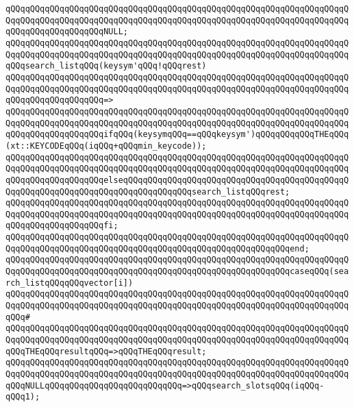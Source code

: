 \verb|qQQqqQQqqQQqqQQqqQQqqQQqqQQqqQQqqQQqqQQqqQQqqQQqqQQqqQQqqQQqqQQqqQQqqQQqqQQqqQQqqQQqqQQqqQQqqQQqqQQqqQQqqQQqqQQqqQQqqQQqqQQqqQQqqQQqqQQqqQQqqQQqqQQqqQQqqQQqqQQqNULL;|\newline
\newline
\verb|qQQqqQQqqQQqqQQqqQQqqQQqqQQqqQQqqQQqqQQqqQQqqQQqqQQqqQQqqQQqqQQqqQQqqQQqqQQqqQQqqQQqqQQqqQQqqQQqqQQqqQQqqQQqqQQqqQQqqQQqqQQqqQQqqQQqqQQqqQQqqQQqsearch_listqQQq(keysym'qQQq!qQQqrest)|\newline
\verb|qQQqqQQqqQQqqQQqqQQqqQQqqQQqqQQqqQQqqQQqqQQqqQQqqQQqqQQqqQQqqQQqqQQqqQQqqQQqqQQqqQQqqQQqqQQqqQQqqQQqqQQqqQQqqQQqqQQqqQQqqQQqqQQqqQQqqQQqqQQqqQQqqQQqqQQqqQQqqQQq=>|\newline
\verb|qQQqqQQqqQQqqQQqqQQqqQQqqQQqqQQqqQQqqQQqqQQqqQQqqQQqqQQqqQQqqQQqqQQqqQQqqQQqqQQqqQQqqQQqqQQqqQQqqQQqqQQqqQQqqQQqqQQqqQQqqQQqqQQqqQQqqQQqqQQqqQQqqQQqqQQqqQQqqQQqifqQQq(keysymqQQq==qQQqkeysym')qQQqqQQqqQQqTHEqQQq(xt::KEYCODEqQQq(iqQQq+qQQqmin_keycode));|\newline
\verb|qQQqqQQqqQQqqQQqqQQqqQQqqQQqqQQqqQQqqQQqqQQqqQQqqQQqqQQqqQQqqQQqqQQqqQQqqQQqqQQqqQQqqQQqqQQqqQQqqQQqqQQqqQQqqQQqqQQqqQQqqQQqqQQqqQQqqQQqqQQqqQQqqQQqqQQqqQQqqQQqelseqQQqqQQqqQQqqQQqqQQqqQQqqQQqqQQqqQQqqQQqqQQqqQQqqQQqqQQqqQQqqQQqqQQqqQQqqQQqqQQqqQQqsearch_listqQQqrest;|\newline
\verb|qQQqqQQqqQQqqQQqqQQqqQQqqQQqqQQqqQQqqQQqqQQqqQQqqQQqqQQqqQQqqQQqqQQqqQQqqQQqqQQqqQQqqQQqqQQqqQQqqQQqqQQqqQQqqQQqqQQqqQQqqQQqqQQqqQQqqQQqqQQqqQQqqQQqqQQqqQQqqQQqfi;|\newline
\verb|qQQqqQQqqQQqqQQqqQQqqQQqqQQqqQQqqQQqqQQqqQQqqQQqqQQqqQQqqQQqqQQqqQQqqQQqqQQqqQQqqQQqqQQqqQQqqQQqqQQqqQQqqQQqqQQqqQQqqQQqqQQqqQQqend;|\newline
\newline
\verb|qQQqqQQqqQQqqQQqqQQqqQQqqQQqqQQqqQQqqQQqqQQqqQQqqQQqqQQqqQQqqQQqqQQqqQQqqQQqqQQqqQQqqQQqqQQqqQQqqQQqqQQqqQQqqQQqqQQqqQQqqQQqqQQqcaseqQQq(search_listqQQqqQQqvector[i])|\newline
\verb|qQQqqQQqqQQqqQQqqQQqqQQqqQQqqQQqqQQqqQQqqQQqqQQqqQQqqQQqqQQqqQQqqQQqqQQqqQQqqQQqqQQqqQQqqQQqqQQqqQQqqQQqqQQqqQQqqQQqqQQqqQQqqQQqqQQqqQQqqQQqqQQq#|\newline
\verb|qQQqqQQqqQQqqQQqqQQqqQQqqQQqqQQqqQQqqQQqqQQqqQQqqQQqqQQqqQQqqQQqqQQqqQQqqQQqqQQqqQQqqQQqqQQqqQQqqQQqqQQqqQQqqQQqqQQqqQQqqQQqqQQqqQQqqQQqqQQqqQQqTHEqQQqresultqQQq=>qQQqTHEqQQqresult;|\newline
\verb|qQQqqQQqqQQqqQQqqQQqqQQqqQQqqQQqqQQqqQQqqQQqqQQqqQQqqQQqqQQqqQQqqQQqqQQqqQQqqQQqqQQqqQQqqQQqqQQqqQQqqQQqqQQqqQQqqQQqqQQqqQQqqQQqqQQqqQQqqQQqqQQqNULLqQQqqQQqqQQqqQQqqQQqqQQqqQQq=>qQQqsearch_slotsqQQq(iqQQq-qQQq1);|\newline
